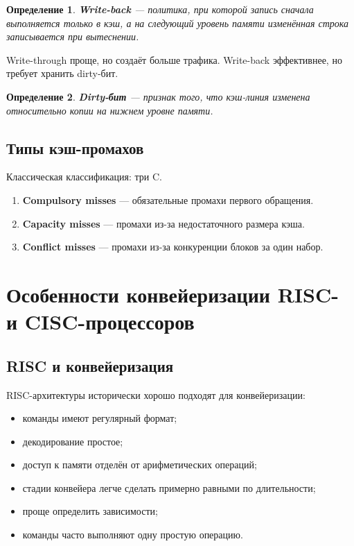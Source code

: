 \documentclass[12pt,a4paper]{article}
\newtheorem{definition}{Определение}
\begin{document}
\begin{definition}
\textbf{Write-back} --- политика, при которой запись сначала выполняется только в кэш, а на следующий уровень памяти изменённая строка записывается при вытеснении.
\end{definition}

Write-through проще, но создаёт больше трафика.
Write-back эффективнее, но требует хранить dirty-бит.

\begin{definition}
\textbf{Dirty-бит} --- признак того, что кэш-линия изменена относительно копии на нижнем уровне памяти.
\end{definition}

\subsection{Типы кэш-промахов}

Классическая классификация: три C.

\begin{enumerate}
    \item \textbf{Compulsory misses} --- обязательные промахи первого обращения.
    \item \textbf{Capacity misses} --- промахи из-за недостаточного размера кэша.
    \item \textbf{Conflict misses} --- промахи из-за конкуренции блоков за один набор.
\end{enumerate}

\section{Особенности конвейеризации RISC- и CISC-процессоров}

\subsection{RISC и конвейеризация}

RISC-архитектуры исторически хорошо подходят для конвейеризации:

\begin{itemize}
    \item команды имеют регулярный формат;
    \item декодирование простое;
    \item доступ к памяти отделён от арифметических операций;
    \item стадии конвейера легче сделать примерно равными по длительности;
    \item проще определить зависимости;
    \item команды часто выполняют одну простую операцию.
\end{itemize}
\end{document}
